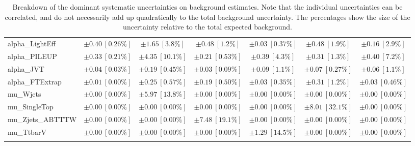 \begin{sidewaystable}
\begin{center}
\begin{tabular*}{\textwidth}{@{\extracolsep{\fill}}lcccccc}
alpha\_LightEff         & $\pm 0.40\ [0.26\%] $          & $\pm 1.65\ [3.8\%] $          & $\pm 0.48\ [1.2\%] $          & $\pm 0.03\ [0.37\%] $          & $\pm 0.48\ [1.9\%] $          & $\pm 0.16\ [2.9\%] $       \\
alpha\_PILEUP         & $\pm 0.33\ [0.21\%] $          & $\pm 4.35\ [10.1\%] $          & $\pm 0.21\ [0.53\%] $          & $\pm 0.39\ [4.3\%] $          & $\pm 0.31\ [1.3\%] $          & $\pm 0.40\ [7.2\%] $       \\
alpha\_JVT         & $\pm 0.04\ [0.03\%] $          & $\pm 0.19\ [0.45\%] $          & $\pm 0.03\ [0.09\%] $          & $\pm 0.09\ [1.1\%] $          & $\pm 0.07\ [0.27\%] $          & $\pm 0.06\ [1.1\%] $       \\
alpha\_FTExtrap         & $\pm 0.01\ [0.00\%] $          & $\pm 0.25\ [0.57\%] $          & $\pm 0.19\ [0.50\%] $          & $\pm 0.03\ [0.35\%] $          & $\pm 0.31\ [1.2\%] $          & $\pm 0.03\ [0.46\%] $       \\
mu\_Wjets         & $\pm 0.00\ [0.00\%] $          & $\pm 5.97\ [13.8\%] $          & $\pm 0.00\ [0.00\%] $          & $\pm 0.00\ [0.00\%] $          & $\pm 0.00\ [0.00\%] $          & $\pm 0.00\ [0.00\%] $       \\
mu\_SingleTop         & $\pm 0.00\ [0.00\%] $          & $\pm 0.00\ [0.00\%] $          & $\pm 0.00\ [0.00\%] $          & $\pm 0.00\ [0.00\%] $          & $\pm 8.01\ [32.1\%] $          & $\pm 0.00\ [0.00\%] $       \\
mu\_Zjets\_ABTTTW         & $\pm 0.00\ [0.00\%] $          & $\pm 0.00\ [0.00\%] $          & $\pm 7.48\ [19.1\%] $          & $\pm 0.00\ [0.00\%] $          & $\pm 0.00\ [0.00\%] $          & $\pm 0.00\ [0.00\%] $       \\
mu\_TtbarV         & $\pm 0.00\ [0.00\%] $          & $\pm 0.00\ [0.00\%] $          & $\pm 0.00\ [0.00\%] $          & $\pm 1.29\ [14.5\%] $          & $\pm 0.00\ [0.00\%] $          & $\pm 0.00\ [0.00\%] $       \\
\noalign{\smallskip}\hline\noalign{\smallskip}
\end{tabular*}
\end{center}
\caption[Breakdown of uncertainty on background estimates]{
Breakdown of the dominant systematic uncertainties on background estimates.
Note that the individual uncertainties can be correlated, and do not necessarily add up quadratically to 
the total background uncertainty. The percentages show the size of the uncertainty relative to the total expected background.
\label{table.results.bkgestimate.uncertainties.VRTopC_bybkg}}
\end{sidewaystable}
%